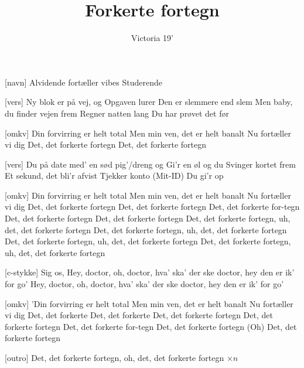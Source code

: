 \documentclass[a4paper,11pt]{article}
\title{Forkerte fortegn}
\author{Victoria 19'}
\begin{document}
\maketitle

\begin{roles}
[navn] Alvidende fortæller vibes
 Studerende 
\end{roles}



\begin{song}

  [vers] Ny blok er på vej, og 
  Opgaven lurer 
  Den er slemmere end slem
  Men baby, du finder vejen frem
  Regner natten lang 
  Du har prøvet det før 

[omkv] Din forvirring er helt total 
Men min ven, det er helt banalt
Nu fortæller vi dig
Det, det forkerte fortegn 
Det, det forkerte fortegn 


[vers] Du på date med' en sød pig'/dreng og
Gi'r en øl og du
Svinger kortet frem
Et sekund, det bli'r afvist 
Tjekker konto
(Mit-ID) Du gi'r op 


[omkv] Din forvirring er helt total 
Men min ven, det er helt banalt
Nu fortæller vi dig
Det, det forkerte fortegn 
Det, det forkerte fortegn 
Det, det forkerte for-tegn 
Det, det forkerte fortegn 
Det, det forkerte fortegn 
Det, det forkerte fortegn, uh, det, det forkerte fortegn 
Det, det forkerte fortegn, uh, det, det forkerte fortegn
Det, det forkerte fortegn, uh, det, det forkerte fortegn 
Det, det forkerte fortegn, uh, det, det forkerte fortegn


[c-stykke] Sig os, 
Hey, doctor, oh, doctor, hva' ska' der ske doctor, hey den er ik' for go'
Hey, doctor, oh, doctor, hva' ska' der ske doctor, hey den er ik' for go'


[omkv] 'Din forvirring er helt total 
Men min ven, det er helt banalt
Nu fortæller vi dig
Det, det forkerte
Det, det forkerte
Det, det forkerte fortegn 
Det, det forkerte fortegn 
Det, det forkerte for-tegn 
Det, det forkerte fortegn 
(Oh) Det, det forkerte fortegn 


[outro] Det, det forkerte fortegn, oh, det, det forkerte fortegn $\times n$


  
\end{song}
\end{document}
